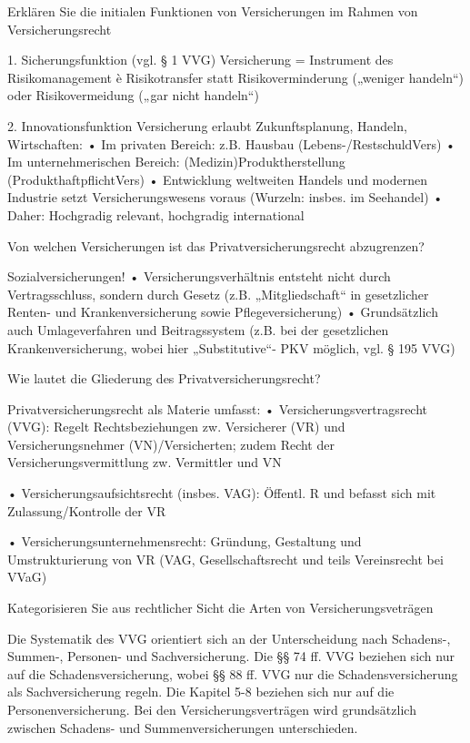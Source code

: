 Erklären Sie die initialen Funktionen von Versicherungen im Rahmen von Versicherungsrecht

1. Sicherungsfunktion (vgl. § 1 VVG)
Versicherung = Instrument des Risikomanagement è
Risikotransfer statt Risikoverminderung („weniger handeln“) oder
Risikovermeidung („gar nicht handeln“)

2. Innovationsfunktion
Versicherung erlaubt Zukunftsplanung, Handeln, Wirtschaften:
• Im privaten Bereich: z.B. Hausbau (Lebens-/RestschuldVers)
• Im unternehmerischen Bereich: (Medizin)Produktherstellung
(ProdukthaftpflichtVers)
• Entwicklung weltweiten Handels und modernen Industrie setzt
Versicherungswesens voraus (Wurzeln: insbes. im Seehandel)
• Daher: Hochgradig relevant, hochgradig international


Von welchen Versicherungen ist das Privatversicherungsrecht abzugrenzen?

Sozialversicherungen!
• Versicherungsverhältnis entsteht nicht durch Vertragsschluss,
sondern durch Gesetz (z.B. „Mitgliedschaft“ in gesetzlicher
Renten- und Krankenversicherung sowie Pflegeversicherung)
• Grundsätzlich auch Umlageverfahren und Beitragssystem (z.B. bei
der gesetzlichen Krankenversicherung, wobei hier „Substitutive“-
PKV möglich, vgl. § 195 VVG)


Wie lautet die Gliederung des Privatversicherungsrecht?

Privatversicherungsrecht als Materie umfasst:
• Versicherungsvertragsrecht (VVG): 
Regelt Rechtsbeziehungen zw. Versicherer (VR) und
Versicherungsnehmer (VN)/Versicherten; zudem Recht der
Versicherungsvermittlung zw. Vermittler und VN

• Versicherungsaufsichtsrecht (insbes. VAG): 
Öffentl. R und befasst sich mit Zulassung/Kontrolle der VR

• Versicherungsunternehmensrecht: Gründung, Gestaltung
und Umstrukturierung von VR 
(VAG, Gesellschaftsrecht und teils Vereinsrecht bei VVaG)


Kategorisieren Sie aus rechtlicher Sicht die Arten von Versicherungsveträgen

Die Systematik des VVG orientiert sich an der Unterscheidung nach Schadens-, Summen-, Personen- und Sachversicherung. 
Die §§ 74 ff. VVG beziehen sich nur auf die Schadensversicherung, wobei §§ 88 ff. VVG nur die Schadensversicherung als Sachversicherung regeln. 
Die Kapitel 5-8 beziehen sich nur auf die Personenversicherung. 
Bei den Versicherungsverträgen wird grundsätzlich zwischen Schadens- und Summenversicherungen unterschieden.

